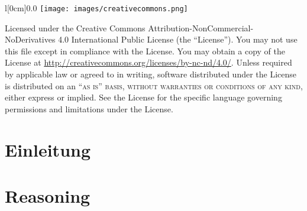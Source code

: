 \documentclass[11pt,oneside]{book} %
\begin{document}
\noindent
\begin{wrapfigure}[4]{l}[0cm]{0.0\textwidth}
\texttt{[image: images/creativecommons.png]}
\end{wrapfigure}
 Licensed under the Creative Commons Attribution-NonCommercial-NoDerivatives 4.0 International Public License (the ``License''). You may not use this file except in compliance with the License. You may obtain a copy of the License at \url{http://creativecommons.org/licenses/by-nc-nd/4.0/}. Unless required by applicable law or agreed to in writing, software distributed under the License is distributed on an \textsc{``as is'' basis, without warranties or conditions of any kind}, either express or implied. See the License for the specific language governing permissions and limitations under the License.\\ %





\pagestyle{empty} %

\tableofcontents %


\pagestyle{fancy} %

\part{Einleitung}



\part{Reasoning}



\end{document}
